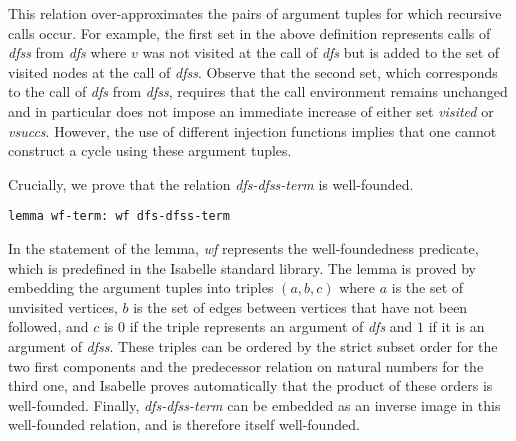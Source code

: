 \documentclass[sigplan,10pt,anonymous,review]{acmart}
\newcommand{\prog}[1]{\textit{#1}}
\begin{document}
This relation over-approximates the pairs of argument tuples for which recursive calls occur. For example, the first set in the above definition represents calls of \prog{dfss} from \prog{dfs} where $v$ was not visited at the call of \prog{dfs} but is added to the set of visited nodes at the call of \prog{dfss}. Observe that the second set, which corresponds to the call of \prog{dfs} from \prog{dfss}, requires that the call environment remains unchanged and in particular does not impose an immediate increase of either set \prog{visited} or \prog{vsuccs}. However, the use of different injection functions implies that one cannot construct a cycle using these argument tuples.

Crucially, we prove that the relation \prog{dfs-dfss-term} is well-founded.

\begin{small}
\begin{lstlisting}[language=isabelle]
lemma wf-term: wf dfs-dfss-term
\end{lstlisting}
\end{small}

In the statement of the lemma, \prog{wf} represents the well-foundedness predicate, which is predefined in the Isabelle standard library. The lemma is proved by embedding the argument tuples into triples $(a,b,c)$ where $a$ is the set of unvisited vertices, $b$ is the set of edges between vertices that have not been followed, and $c$ is $0$ if the triple represents an argument of \prog{dfs} and $1$ if it is an argument of \prog{dfss}. These triples can be ordered by the strict subset order for the two first components and the predecessor relation on natural numbers for the third one, and Isabelle proves automatically that the product of these orders is well-founded. Finally, \prog{dfs-dfss-term} can be embedded as an inverse image in this well-founded relation, and is therefore itself well-founded.
\end{document}
